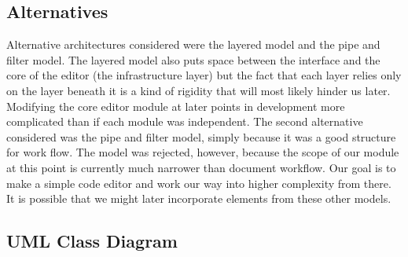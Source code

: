 \documentclass{llncs}
\begin{document}
\subsection{Alternatives}
Alternative architectures considered were the layered model and the pipe and filter model. The layered model also puts space between the interface and the core of the editor (the infrastructure layer) but the fact that each layer relies only on the layer beneath it is a kind of rigidity that will most likely hinder us later. Modifying the core editor module at later points in development more complicated than if each module was independent. The second alternative considered was the pipe and filter model, simply because it was a good structure for work flow. The model was rejected, however, because the scope of our module at this point is currently much narrower than document workflow. Our goal is to make a simple code editor and work our way into higher complexity from there. It is possible that we might later incorporate elements from these other models.

\subsection{UML Class Diagram}
\noindent{}

\clearpage
\end{document}
